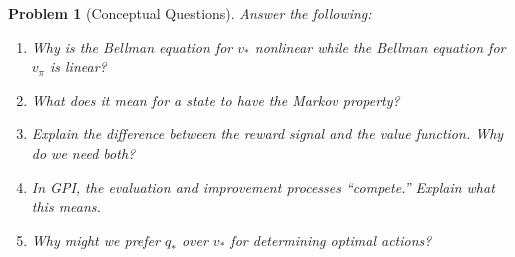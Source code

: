 \documentclass[11pt]{article}
\newtheorem{problem}{Problem}
\theoremstyle{definition}
\begin{document}
\newpage

\begin{problem}[Conceptual Questions]
Answer the following:
\begin{enumerate}[label=(\alph*)]
    \item Why is the Bellman equation for $v_*$ nonlinear while the Bellman equation for $v_\pi$ is linear?
    \item What does it mean for a state to have the Markov property?
    \item Explain the difference between the reward signal and the value function. Why do we need both?
    \item In GPI, the evaluation and improvement processes ``compete.'' Explain what this means.
    \item Why might we prefer $q_*$ over $v_*$ for determining optimal actions?
\end{enumerate}
\end{problem}
\end{document}
